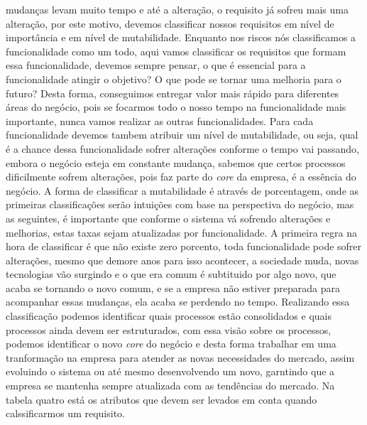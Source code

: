     mudanças levam muito tempo e até a alteração, o requisito já sofreu mais uma
    alteração, por este motivo, devemos classificar nossos requisitos em nível
    de importância e em nível de mutabilidade. Enquanto nos riscos nós classificamos
    a funcionalidade como um todo, aqui vamos classificar os requisitos que formam
    essa funcionalidade, devemos sempre pensar, o que é essencial para a funcionalidade
    atingir o objetivo? O que pode se tornar uma melhoria para o futuro? Desta
    forma, conseguimos entregar valor mais rápido para diferentes áreas do negócio,
    pois se focarmos todo o nosso tempo na funcionalidade mais importante, nunca
    vamos realizar as outras funcionalidades. Para cada funcionalidade devemos
    tambem atribuir um nível de mutabilidade, ou seja, qual é a chance dessa
    funcionalidade sofrer alterações conforme o tempo vai passando, embora o
    negócio esteja em constante mudança, sabemos que certos processos dificilmente
    sofrem alterações, pois faz parte do \textit{core} da empresa, é a essência
    do negócio. A forma de classificar a mutabilidade é através de porcentagem,
    onde as primeiras classificações serão intuições com base na perspectiva do
    negócio, mas as seguintes, é importante que conforme o sistema vá sofrendo
    alterações e melhorias, estas taxas sejam atualizadas por funcionalidade.
    A primeira regra na hora de classificar é que não existe zero porcento, toda
    funcionalidade pode sofrer alterações, mesmo que demore anos para isso acontecer,
    a sociedade muda, novas tecnologias vão surgindo e o que era comum é subtituido
    por algo novo, que acaba se tornando o novo comum, e se a empresa não estiver
    preparada para acompanhar essas mudanças, ela acaba se perdendo no tempo.
    Realizando essa classificação podemos identificar quais processos estão
    consolidados e quais processos ainda devem ser estruturados, com essa visão
    sobre os processos, podemos identificar o novo \textit{core} do negócio e
    desta forma trabalhar em uma tranformação na empresa para atender as novas
    necessidades do mercado, assim evoluindo o sistema ou até mesmo desenvolvendo
    um novo, garntindo que a empresa se mantenha sempre atualizada com as tendências
    do mercado. Na tabela quatro está os atributos que devem ser levados em conta
    quando calssificarmos um requisito.\newline

